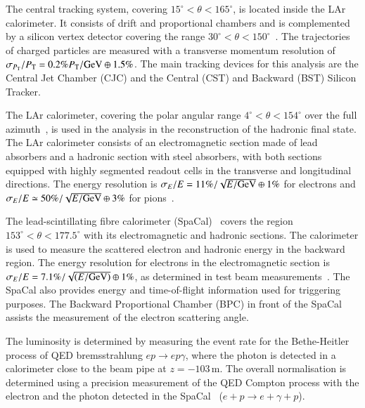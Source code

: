 \documentclass[12pt]{article}
\begin{document}
The central tracking system, covering $15^\circ < \theta < 165^\circ$, is located inside the LAr calorimeter. 
It consists of drift and proportional chambers and is complemented by a silicon vertex detector covering the 
range $30^\circ < \theta < 150^\circ$~\cite{Pitzl}. 
The trajectories of charged particles are measured 
with a transverse momentum resolution of $\sigma_{P_{\mathrm{T}} }/P_{\mathrm{T}} = 0.2\% {P_{\mathrm{T}}/\GeV}\oplus 1.5\%$.
The main tracking devices for this analysis 
are the Central Jet Chamber (CJC) and the Central (CST) and Backward (BST) Silicon Tracker.


The LAr calorimeter, covering the polar angular range $4^\circ<\theta<154^\circ$ over
the full azimuth~\cite{Andrieu}, is used in the analysis in the reconstruction of the 
hadronic final state. 
The LAr calorimeter consists of an electromagnetic section made of lead absorbers 
and a hadronic section with steel absorbers, with both sections equipped with highly 
segmented readout cells in the transverse and longitudinal directions. 
The energy resolution is $\sigma_E/E = 11\%/\sqrt{E/\GeV}\oplus 1\%$ for electrons and 
$\sigma_{E}/E \simeq 50\%/\sqrt{E/\GeV}\oplus 3\%$ for pions~\cite{LAr1,LAr2}. 

The lead-scintillating fibre calorimeter (SpaCal)~\cite{Appuhn} covers the region
$153^\circ<\theta<177.5^\circ$ with its electromagnetic and hadronic sections. The calorimeter is used to 
measure the scattered electron and hadronic energy in the backward region. The energy resolution for electrons 
in the electromagnetic section is $\sigma_{E}/E = 7.1\%/\sqrt{(E/\GeV)} \oplus 1\%$, as determined in test 
beam measurements~\cite{Andrieu,Nicholls}. 
The SpaCal also provides energy and time-of-flight information 
used for triggering purposes. 
The Backward Proportional Chamber (BPC) in front of the SpaCal assists the measurement of the electron scattering angle.

The luminosity is determined by measuring the event rate for the Bethe-Heitler process of QED 
bremsstrahlung \mbox{$ep\rightarrow ep\gamma$}, where the photon is detected in a calorimeter 
close to the beam pipe at $z=-103\,\mathrm{m}$. 
The overall normalisation is determined using a precision measurement of the QED Compton process 
with the electron and the photon detected in the SpaCal~\cite{AaronQED} ($e+p\rightarrow e+\gamma+p$).


\end{document}
